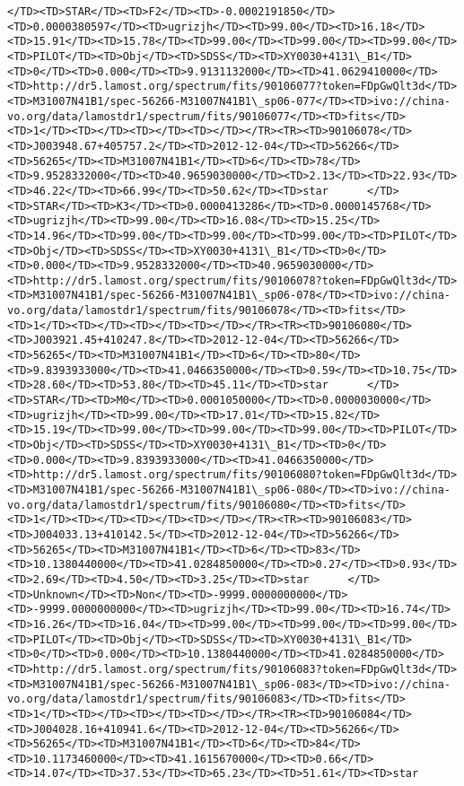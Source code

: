\documentclass[11pt]{article}
\begin{document}
\begin{Verbatim}[commandchars=\\\{\}]
</TD><TD>STAR</TD><TD>F2</TD><TD>-0.0002191850</TD><TD>0.0000380597</TD><TD>ugrizjh</TD><TD>99.00</TD><TD>16.18</TD><TD>15.91</TD><TD>15.78</TD><TD>99.00</TD><TD>99.00</TD><TD>99.00</TD><TD>PILOT</TD><TD>Obj</TD><TD>SDSS</TD><TD>XY0030+4131\_B1</TD><TD>0</TD><TD>0.000</TD><TD>9.9131132000</TD><TD>41.0629410000</TD><TD>http://dr5.lamost.org/spectrum/fits/90106077?token=FDpGwQlt3d</TD><TD>M31007N41B1/spec-56266-M31007N41B1\_sp06-077</TD><TD>ivo://china-vo.org/data/lamostdr1/spectrum/fits/90106077</TD><TD>fits</TD><TD>1</TD><TD></TD><TD></TD><TD></TD></TR><TR><TD>90106078</TD><TD>J003948.67+405757.2</TD><TD>2012-12-04</TD><TD>56266</TD><TD>56265</TD><TD>M31007N41B1</TD><TD>6</TD><TD>78</TD><TD>9.9528332000</TD><TD>40.9659030000</TD><TD>2.13</TD><TD>22.93</TD><TD>46.22</TD><TD>66.99</TD><TD>50.62</TD><TD>star      </TD><TD>STAR</TD><TD>K3</TD><TD>0.0000413286</TD><TD>0.0000145768</TD><TD>ugrizjh</TD><TD>99.00</TD><TD>16.08</TD><TD>15.25</TD><TD>14.96</TD><TD>99.00</TD><TD>99.00</TD><TD>99.00</TD><TD>PILOT</TD><TD>Obj</TD><TD>SDSS</TD><TD>XY0030+4131\_B1</TD><TD>0</TD><TD>0.000</TD><TD>9.9528332000</TD><TD>40.9659030000</TD><TD>http://dr5.lamost.org/spectrum/fits/90106078?token=FDpGwQlt3d</TD><TD>M31007N41B1/spec-56266-M31007N41B1\_sp06-078</TD><TD>ivo://china-vo.org/data/lamostdr1/spectrum/fits/90106078</TD><TD>fits</TD><TD>1</TD><TD></TD><TD></TD><TD></TD></TR><TR><TD>90106080</TD><TD>J003921.45+410247.8</TD><TD>2012-12-04</TD><TD>56266</TD><TD>56265</TD><TD>M31007N41B1</TD><TD>6</TD><TD>80</TD><TD>9.8393933000</TD><TD>41.0466350000</TD><TD>0.59</TD><TD>10.75</TD><TD>28.60</TD><TD>53.80</TD><TD>45.11</TD><TD>star      </TD><TD>STAR</TD><TD>M0</TD><TD>0.0001050000</TD><TD>0.0000030000</TD><TD>ugrizjh</TD><TD>99.00</TD><TD>17.01</TD><TD>15.82</TD><TD>15.19</TD><TD>99.00</TD><TD>99.00</TD><TD>99.00</TD><TD>PILOT</TD><TD>Obj</TD><TD>SDSS</TD><TD>XY0030+4131\_B1</TD><TD>0</TD><TD>0.000</TD><TD>9.8393933000</TD><TD>41.0466350000</TD><TD>http://dr5.lamost.org/spectrum/fits/90106080?token=FDpGwQlt3d</TD><TD>M31007N41B1/spec-56266-M31007N41B1\_sp06-080</TD><TD>ivo://china-vo.org/data/lamostdr1/spectrum/fits/90106080</TD><TD>fits</TD><TD>1</TD><TD></TD><TD></TD><TD></TD></TR><TR><TD>90106083</TD><TD>J004033.13+410142.5</TD><TD>2012-12-04</TD><TD>56266</TD><TD>56265</TD><TD>M31007N41B1</TD><TD>6</TD><TD>83</TD><TD>10.1380440000</TD><TD>41.0284850000</TD><TD>0.27</TD><TD>0.93</TD><TD>2.69</TD><TD>4.50</TD><TD>3.25</TD><TD>star      </TD><TD>Unknown</TD><TD>Non</TD><TD>-9999.0000000000</TD><TD>-9999.0000000000</TD><TD>ugrizjh</TD><TD>99.00</TD><TD>16.74</TD><TD>16.26</TD><TD>16.04</TD><TD>99.00</TD><TD>99.00</TD><TD>99.00</TD><TD>PILOT</TD><TD>Obj</TD><TD>SDSS</TD><TD>XY0030+4131\_B1</TD><TD>0</TD><TD>0.000</TD><TD>10.1380440000</TD><TD>41.0284850000</TD><TD>http://dr5.lamost.org/spectrum/fits/90106083?token=FDpGwQlt3d</TD><TD>M31007N41B1/spec-56266-M31007N41B1\_sp06-083</TD><TD>ivo://china-vo.org/data/lamostdr1/spectrum/fits/90106083</TD><TD>fits</TD><TD>1</TD><TD></TD><TD></TD><TD></TD></TR><TR><TD>90106084</TD><TD>J004028.16+410941.6</TD><TD>2012-12-04</TD><TD>56266</TD><TD>56265</TD><TD>M31007N41B1</TD><TD>6</TD><TD>84</TD><TD>10.1173460000</TD><TD>41.1615670000</TD><TD>0.66</TD><TD>14.07</TD><TD>37.53</TD><TD>65.23</TD><TD>51.61</TD><TD>star      
\end{Verbatim}
\end{document}
